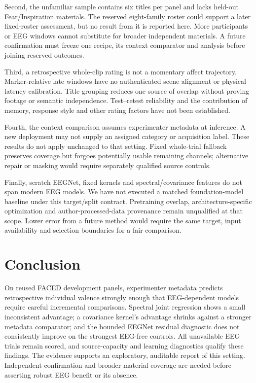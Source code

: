 \documentclass[conference]{IEEEtran}
\begin{document}
Second, the unfamiliar sample contains six titles per panel and lacks held-out Fear/Inspiration materials. The reserved eight-family roster could support a later fixed-roster assessment, but no result from it is reported here. More participants or EEG windows cannot substitute for broader independent materials. A future confirmation must freeze one recipe, its context comparator and analysis before joining reserved outcomes.

Third, a retrospective whole-clip rating is not a momentary affect trajectory. Marker-relative late windows have no authenticated scene alignment or physical latency calibration. Title grouping reduces one source of overlap without proving footage or semantic independence. Test--retest reliability and the contribution of memory, response style and other rating factors have not been established.

Fourth, the context comparison assumes experimenter metadata at inference. A new deployment may not supply an assigned category or acquisition label. These results do not apply unchanged to that setting. Fixed whole-trial fallback preserves coverage but forgoes potentially usable remaining channels; alternative repair or masking would require separately qualified source controls.

Finally, scratch EEGNet, fixed kernels and spectral/covariance features do not span modern EEG models. We have not executed a matched foundation-model baseline under this target/split contract. Pretraining overlap, architecture-specific optimization and author-processed-data provenance remain unqualified at that scope. Lower error from a future method would require the same target, input availability and selection boundaries for a fair comparison.

\section{Conclusion}
On reused FACED development panels, experimenter metadata predicts retrospective individual valence strongly enough that EEG-dependent models require careful incremental comparisons. Spectral joint regression shows a small inconsistent advantage; a covariance kernel's advantage shrinks against a stronger metadata comparator; and the bounded EEGNet residual diagnostic does not consistently improve on the strongest EEG-free controls. All unavailable EEG trials remain scored, and source-capacity and learning diagnostics qualify these findings. The evidence supports an exploratory, auditable report of this setting. Independent confirmation and broader material coverage are needed before asserting robust EEG benefit or its absence.
\end{document}
